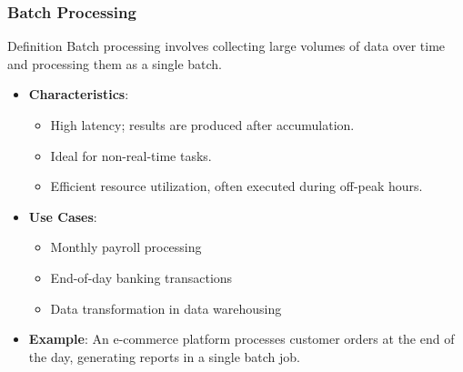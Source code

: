 \documentclass[aspectratio=169]{beamer}
\begin{document}
\begin{frame}[fragile]
    \frametitle{Batch Processing}
    \begin{block}{Definition}
        Batch processing involves collecting large volumes of data over time and processing them as a single batch.
    \end{block}
    \begin{itemize}
        \item \textbf{Characteristics}:
        \begin{itemize}
            \item High latency; results are produced after accumulation.
            \item Ideal for non-real-time tasks.
            \item Efficient resource utilization, often executed during off-peak hours.
        \end{itemize}
        
        \item \textbf{Use Cases}:
        \begin{itemize}
            \item Monthly payroll processing
            \item End-of-day banking transactions
            \item Data transformation in data warehousing
        \end{itemize}
        
        \item \textbf{Example}:
        An e-commerce platform processes customer orders at the end of the day, generating reports in a single batch job.
    \end{itemize}
\end{frame}
\end{document}
